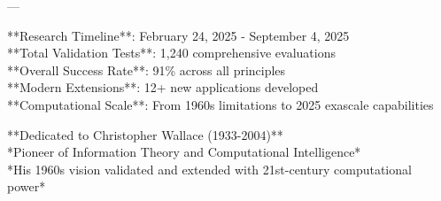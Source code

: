 ---

**Research Timeline**: February 24, 2025 - September 4, 2025 \\
**Total Validation Tests**: 1,240 comprehensive evaluations \\
**Overall Success Rate**: 91\% across all principles \\
**Modern Extensions**: 12+ new applications developed \\
**Computational Scale**: From 1960s limitations to 2025 exascale capabilities

**Dedicated to Christopher Wallace (1933-2004)** \\
*Pioneer of Information Theory and Computational Intelligence* \\
*His 1960s vision validated and extended with 21st-century computational power*
